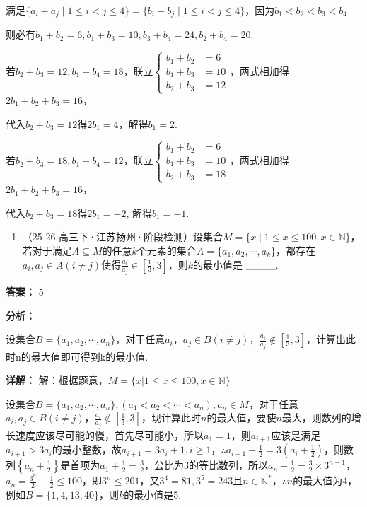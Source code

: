 \documentclass[11pt,a4paper]{ctexart}
\begin{document}
满足\(\{a_i+a_j\mid 1\leq i<j\leq4\}=\{b_i+b_j\mid 1\leq i<j\leq4\}\)，因为\(b_{1} < b_{2} < b_{3} < b_{4}\)

则必有\(b_{1}+b_{2}=6,b_{1}+b_{3}=10,b_{3}+b_{4}=24,b_{2}+b_{4}=20.\)

若\(b_{2}+b_{3}=12,b_{1}+b_{4}=18\)，联立\(\left\{\begin{aligned}b_{1}+b_{2}&=6\\ b_{1}+b_{3}&=10\\ b_{2}+b_{3}&=12\end{aligned}\right.\)，两式相加得\(2b_{1}+b_{2}+b_{3}=16\)，

代入\(b_{2}+b_{3}=12\)得\(2b_{1}=4\)，解得\(b_{1}=2\).

若\(b_{2}+b_{3}=18,b_{1}+b_{4}=12\)，联立\(\left\{\begin{aligned}b_{1}+b_{2}&=6\\ b_{1}+b_{3}&=10\\ b_{2}+b_{3}&=18\end{aligned}\right.\)，两式相加得\(2b_{1}+b_{2}+b_{3}=16\)，

代入\(b_{2}+b_{3}=18\)得\(2b_{1}=-2\), 解得\(b_{1}=-1\).

\begin{enumerate}[label=\arabic*., leftmargin=*, start=7]
\item （25-26
  高三下·江苏扬州·阶段检测）设集合\(M = \{x \mid 1 \leq x \leq 100, x \in \mathbb{N}\}\)，若对于满足\(A \subseteq M\)的任意\(k\)个元素的集合\(A = \{a_1, a_2, \cdots, a_k\}\)，都存在\(a_i, a_j \in A (i \neq j)\)使得\(\frac{a_i}{a_j} \in \left[\frac{1}{3}, 3\right]\)，则\(k\)的最小值是
  \_\_\_\_.
\end{enumerate}

\textbf{答案：}
5

\textbf{分析：}

设集合\(B=\{a_{1},a_{2},\cdots,a_{n}\}\)，对于任意\(a_{i}\)，\(a_{j}\in B(i\neq j)\)，\(\frac{a_{i}}{a_{j}}\notin\left[\frac{1}{3},3\right]\)，计算出此时n的最大值即可得到k的最小值.

\textbf{详解：}
解：根据题意，\(M=\{x|1\leq x\leq100,x\in \mathbb{N}\}\)

设集合\(B = \{a_{1}, a_{2}, \cdots, a_{n}\}, (a_{1} < a_{2} < \cdots < a_{n}), a_{n} \in M\)，对于任意\(a_{i}, a_{j} \in B (i \neq j)\)，\(\frac{a_{i}}{a_{j}} \notin \left[\frac{1}{3}, 3\right]\)，现计算此时\(n\)的最大值，要使\(n\)最大，则数列的增长速度应该尽可能的慢，首先尽可能小，所以\(a_{1} = 1\)，则\(a_{i+1}\)应该是满足\(a_{i+1} > 3a_{i}\)的最小整数，故\(a_{i+1} = 3a_{i} + 1, i \geq 1\)，\(\therefore a_{i+1} + \frac{1}{2} = 3(a_{i} + \frac{1}{2})\)，则数列\(\left\{a_{n} + \frac{1}{2}\right\}\)是首项为\(a_{1} + \frac{1}{2} = \frac{3}{2}\)，公比为3的等比数列，所以\(a_{n} + \frac{1}{2} = \frac{3}{2} \times 3^{n-1}\)，\(a_{n} = \frac{3^{n}}{2} - \frac{1}{2} \leq 100\)，即\(3^{n} \leq 201\)，又\(3^{4} = 81, 3^{5} = 243\)且\(n \in \mathbb{N}^{*}\)，\(\therefore n\)的最大值为4，例如\(B = \{1,4,13,40\}\)，则\(k\)的最小值是5.
\end{document}
